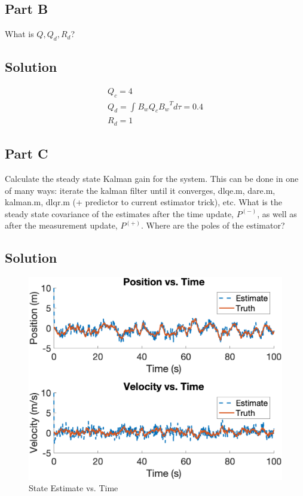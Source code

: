 \documentclass{article}
\begin{document}
\subsection*{Part B}
What is $Q, Q_d, R_d$?
\subsection*{Solution}
\begin{gather*}
    Q_c = 4 \\
    Q_d = \int_{}^{}B_w Q_c {B_w}^T d\tau = 0.4\\
    R_d = 1
\end{gather*}

\subsection*{Part C}
Calculate the steady state Kalman gain for the system. This can be done in one of
many ways: iterate the kalman filter until it converges, dlqe.m, dare.m, kalman.m,
dlqr.m (+ predictor to current estimator trick), etc. What is the steady state
covariance of the estimates after the time update, $P^{(-)}$, as well as after the
measurement update, $P^{(+)}$. Where are the poles of the estimator?
\subsection*{Solution}
\begin{figure}[H]
    \centering
    \includegraphics[width=0.75\linewidth]{../figures/p1c1.png}
    \caption{State Estimate vs. Time}\label{fig:p1c1}
\end{figure}
\end{document}
